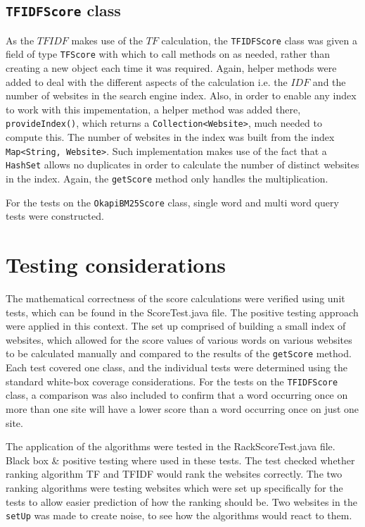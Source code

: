 \subsection{{\tt TFIDFScore} class}
As the $TFIDF$ makes use of the $TF$ calculation, the {\tt TFIDFScore} class was given a field of type {\tt TFScore} with which to call methods on as needed, rather than creating a new object each time it was required. Again, helper methods were added to deal with the different aspects of the calculation i.e. the $IDF$ and the number of websites in the search engine index. Also, in order to enable any index to work with this impementation, a helper method was added there, {\tt provideIndex()}, which returns a {\tt Collection<Website>}, much needed to compute this. The number of websites in the index was built from the index {\tt Map<String, Website>}. Such implementation makes use of the fact that a {\tt HashSet} allows no duplicates in order to calculate the number of distinct websites in the index.
Again, the {\tt getScore} method only handles the multiplication.

For the tests on the {\tt OkapiBM25Score} class, single word and multi word query tests were constructed.

\section{Testing considerations}
The mathematical correctness of the score calculations were verified using unit tests, which can be found in the ScoreTest.java file. The positive testing approach were applied in this context.
The set up comprised of building a small index of websites, which allowed for the score values of various words on various
websites to be calculated manually and compared to the results of the {\tt getScore} method.
Each test covered one class, and the individual tests were determined using the standard white-box coverage considerations. For the tests on the {\tt TFIDFScore} class, a comparison was also included to confirm that a word occurring once on more than one site will have a lower score than a word occurring once on just one site.

The application of the algorithms were tested in the RackScoreTest.java file. Black box & positive testing where used in these tests. The test checked whether ranking algorithm TF and TFIDF would rank the websites correctly. The two ranking algorithms were testing websites which were set up specifically for the tests to allow easier prediction of how the ranking should be. Two websites in the {\tt setUp} was made to create noise, to see how the algorithms would react to them.\\

